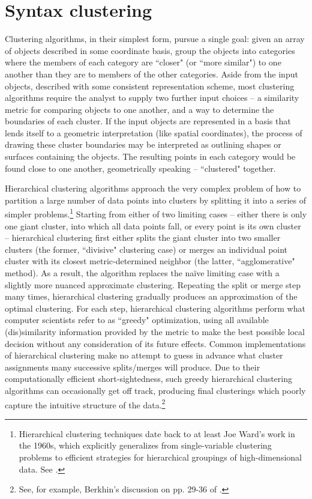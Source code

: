 \section{Syntax clustering}
Clustering algorithms, in their simplest form, pursue a single goal: given an array of objects described in some coordinate basis, group the objects into categories where the members of each category are ``closer" (or ``more similar") to one another than they are to members of the other categories.  Aside from the input objects, described with some consistent representation scheme, most clustering algorithms require the analyst to supply two further input choices -- a similarity metric for comparing objects to one another, and a way to determine the boundaries of each cluster.  If the input objects are represented in a basis that lends itself to a geometric interpretation (like spatial coordinates), the process of drawing these cluster boundaries may be interpreted as outlining shapes or surfaces containing the objects.  The resulting points in each category would be found close to one another, geometrically speaking -- ``clustered" together.

Hierarchical clustering algorithms approach the very complex problem of how to partition a large number of data points into clusters by splitting it into a series of simpler problems.\footnote{Hierarchical clustering techniques date back to at least Joe Ward's work in the 1960s, which explicitly generalizes from single-variable clustering problems to efficient strategies for hierarchical groupings of high-dimensional data.  See \cite{ward1963}.}  Starting from either of two limiting cases -- either there is only one giant cluster, into which all data points fall, or every point is its own cluster -- hierarchical clustering first either splits the giant cluster into two smaller clusters (the former, ``divisive" clustering case) or merges an individual point cluster with its closest metric-determined neighbor (the latter, ``agglomerative"  method).  As a result, the algorithm replaces the na\"{i}ve limiting case with a slightly more nuanced approximate clustering.  Repeating the split or merge step many times, hierarchical clustering gradually produces an approximation of the optimal clustering.  For each step, hierarchical clustering algorithms perform what computer scientists refer to as ``greedy" optimization, using all available (dis)similarity information provided by the metric to make the best possible local decision without any consideration of its future effects.  Common implementations of hierarchical clustering make no attempt to guess in advance what cluster assignments many successive splits/merges will produce.  Due to their computationally efficient short-sightedness, such greedy hierarchical clustering algorithms can occasionally get off track, producing final clusterings which poorly capture the intuitive structure of the data.\footnote{See, for example, Berkhin's discussion on pp. 29-36 of \cite{berkhin2006}.}

